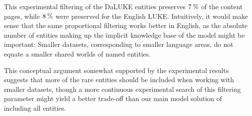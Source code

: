 \documentclass[main.tex]{subfiles}
\begin{document}
This experimental filtering of the DaLUKE entities preserves $7\:\text{\%{}}$ of the content pages, while $8\:\text{\%{}}$ were preserved for the English LUKE.
Intuitively, it would make sense that the same proportional filtering works better in English, as the absolute number of entities making up the implicit knowledge base of the model might be important:
Smaller datasets, corresponding to smaller language areas, do not equate a smaller shared worlds of named entities.

This conceptual argument somewhat supported by the experimental results suggests that more of the rare entities should be included when working with smaller datasets, though a more continuous experimental search of this filtering parameter might yield a better trade-off than our main model solution of including all entities.
\end{document}
